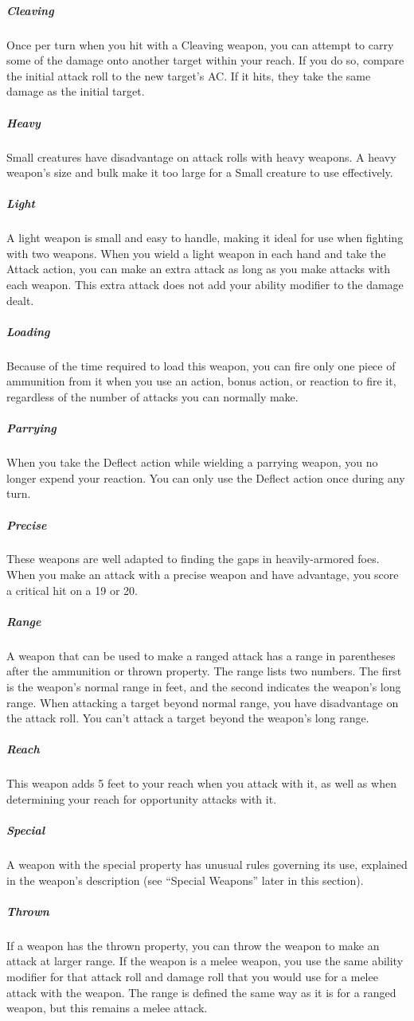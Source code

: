 \subparagraph*{Cleaving} Once per turn when you hit with a Cleaving weapon, you can attempt to carry some of the damage onto another target within your reach. If you do so, compare the initial attack roll to the new target's AC. If it hits, they take the same damage as the initial target.

\subparagraph*{Heavy} Small creatures have disadvantage on attack rolls with heavy weapons. A heavy weapon's size and bulk make it too large for a Small creature to use effectively. 

\subparagraph*{Light} A light weapon is small and easy to handle, making it ideal for use when fighting with two weapons. When you wield a light weapon in each hand and take the Attack action, you can make an extra attack as long as you make attacks with each weapon. This extra attack does not add your ability modifier to the damage dealt.

\subparagraph*{Loading} Because of the time required to load this weapon, you can fire only one piece of ammunition from it when you use an action, bonus action, or reaction to fire it, regardless of the number of attacks you can normally make.

\subparagraph*{Parrying} When you take the Deflect action while wielding a parrying weapon, you no longer expend your reaction. You can only use the Deflect action once during any turn.

\subparagraph*{Precise} These weapons are well adapted to finding the gaps in heavily-armored foes. When you make an attack with a precise weapon and have advantage, you score a critical hit on a 19 or 20.

\subparagraph*{Range} A weapon that can be used to make a ranged attack has a range in parentheses after the ammunition or thrown property. The range lists two numbers. The first is the weapon's normal range in feet, and the second indicates the weapon's long range. When attacking a target beyond normal range, you have disadvantage on the attack roll. You can't attack a target beyond the weapon's long range.

\subparagraph*{Reach} This weapon adds 5 feet to your reach when you attack with it, as well as when determining your reach for opportunity attacks with it.

\subparagraph*{Special} A weapon with the special property has unusual rules governing its use, explained in the weapon's description (see “Special Weapons” later in this section).

\subparagraph*{Thrown} If a weapon has the thrown property, you can throw the weapon to make an attack at larger range. If the weapon is a melee weapon, you use the same ability modifier for that attack roll and damage roll that you would use for a melee attack with the weapon. The range is defined the same way as it is for a ranged weapon, but this remains a melee attack.

